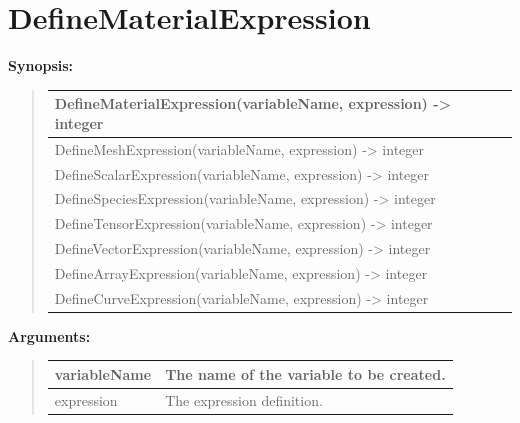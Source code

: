 \documentclass[letterpaper,10pt,english]{sphinxmanual}
\begin{document}
\section{DefineMaterialExpression}
\label{functions:definematerialexpression}
\begin{DUlineblock}{0em}
\item[] \textbf{Synopsis:}
\end{DUlineblock}
\begin{quote}

\begin{tabulary}{\linewidth}{|L|}
\hline

DefineMaterialExpression(variableName, expression) -\textgreater{} integer
\\
\hline
DefineMeshExpression(variableName, expression) -\textgreater{} integer
\\
\hline
DefineScalarExpression(variableName, expression) -\textgreater{} integer
\\
\hline
DefineSpeciesExpression(variableName, expression) -\textgreater{} integer
\\
\hline
DefineTensorExpression(variableName, expression) -\textgreater{} integer
\\
\hline
DefineVectorExpression(variableName, expression) -\textgreater{} integer
\\
\hline
DefineArrayExpression(variableName, expression) -\textgreater{} integer
\\
\hline
DefineCurveExpression(variableName, expression) -\textgreater{} integer
\\
\hline\end{tabulary}

\end{quote}

\begin{DUlineblock}{0em}
\item[] 
\item[] \textbf{Arguments:}
\end{DUlineblock}
\begin{quote}

\begin{tabulary}{\linewidth}{|L|L|}
\hline

variableName
 & 
The name of the variable to be created.
\\
\hline
expression
 & 
The expression definition.
\\
\hline\end{tabulary}

\end{quote}
\end{document}
